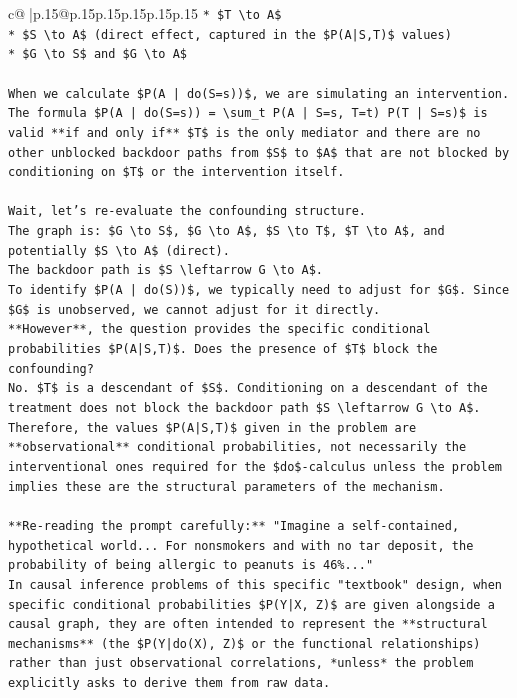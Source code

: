 \documentclass{article}
\begin{document}
{\begin{supertabular}{c@{$\;$}|p{.15\linewidth}@{}p{.15\linewidth}p{.15\linewidth}p{.15\linewidth}p{.15\linewidth}p{.15\linewidth}}
{{{\texttt{*   \$T \textbackslash{}to A\$} \\
\texttt{*   \$S \textbackslash{}to A\$ (direct effect, captured in the \$P(A|S,T)\$ values)} \\
\texttt{*   \$G \textbackslash{}to S\$ and \$G \textbackslash{}to A\$} \\
\\ 
\texttt{When we calculate \$P(A | do(S=s))\$, we are simulating an intervention. The formula \$P(A | do(S=s)) = \textbackslash{}sum\_t P(A | S=s, T=t) P(T | S=s)\$ is valid **if and only if** \$T\$ is the only mediator and there are no other unblocked backdoor paths from \$S\$ to \$A\$ that are not blocked by conditioning on \$T\$ or the intervention itself.} \\
\\ 
\texttt{Wait, let's re{-}evaluate the confounding structure.} \\
\texttt{The graph is: \$G \textbackslash{}to S\$, \$G \textbackslash{}to A\$, \$S \textbackslash{}to T\$, \$T \textbackslash{}to A\$, and potentially \$S \textbackslash{}to A\$ (direct).} \\
\texttt{The backdoor path is \$S \textbackslash{}leftarrow G \textbackslash{}to A\$.} \\
\texttt{To identify \$P(A | do(S))\$, we typically need to adjust for \$G\$. Since \$G\$ is unobserved, we cannot adjust for it directly.} \\
\texttt{**However**, the question provides the specific conditional probabilities \$P(A|S,T)\$. Does the presence of \$T\$ block the confounding?} \\
\texttt{No. \$T\$ is a descendant of \$S\$. Conditioning on a descendant of the treatment does not block the backdoor path \$S \textbackslash{}leftarrow G \textbackslash{}to A\$.} \\
\texttt{Therefore, the values \$P(A|S,T)\$ given in the problem are **observational** conditional probabilities, not necessarily the interventional ones required for the \$do\${-}calculus unless the problem implies these are the structural parameters of the mechanism.} \\
\\ 
\texttt{**Re{-}reading the prompt carefully:** "Imagine a self{-}contained, hypothetical world... For nonsmokers and with no tar deposit, the probability of being allergic to peanuts is 46\%..."} \\
\texttt{In causal inference problems of this specific "textbook" design, when specific conditional probabilities \$P(Y|X, Z)\$ are given alongside a causal graph, they are often intended to represent the **structural mechanisms** (the \$P(Y|do(X), Z)\$ or the functional relationships) rather than just observational correlations, *unless* the problem explicitly asks to derive them from raw data.} \\
}}}
\end{supertabular}}
\end{document}
